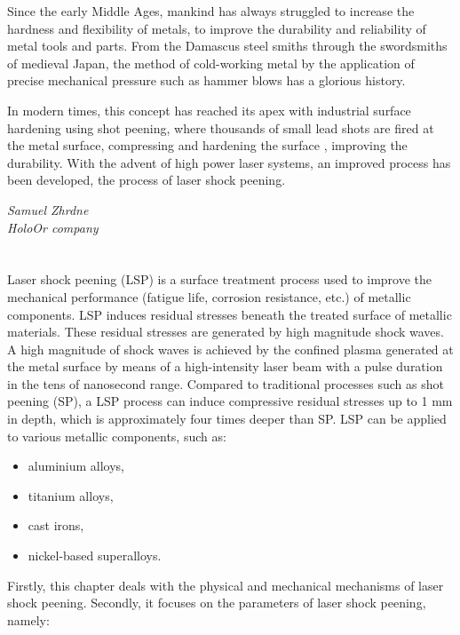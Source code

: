 \epigraph{Since the early Middle Ages, mankind has always struggled to increase the hardness and flexibility of metals, to improve the durability and reliability of  metal tools and parts. From the Damascus steel smiths through the swordsmiths of medieval Japan, the method of cold-working metal by the application of precise mechanical pressure such as hammer blows has a glorious history.

In modern times, this concept has reached its apex with industrial surface hardening using shot peening, where thousands of small lead shots are fired at the metal surface, compressing and hardening the surface , improving the durability. With the advent of high power laser systems, an improved process has been developed, the process of laser shock peening.}{\textit{Samuel Zhrdne\\ HoloOr company}}


\section*{}

Laser shock peening (LSP) is a surface treatment process used to improve the mechanical performance (fatigue life, corrosion resistance, etc.) of metallic components. LSP induces residual stresses beneath the treated surface of metallic materials. These residual stresses are generated by high magnitude shock waves. A high magnitude of shock waves is achieved by the confined plasma generated at the metal surface by means of a high-intensity laser beam with a pulse duration in the tens of nanosecond range. Compared to traditional processes such as shot peening (SP), a LSP process can induce compressive residual stresses up to 1 mm in depth, which is approximately four times deeper than SP. LSP can be applied to various metallic components, such as:

\begin{itemize}
    \item aluminium alloys,
    \item titanium alloys,
    \item cast irons,
    \item nickel-based superalloys.
\end{itemize}

Firstly, this chapter deals with the physical and mechanical mechanisms of laser shock peening. Secondly, it focuses on the parameters of laser shock peening, namely:

